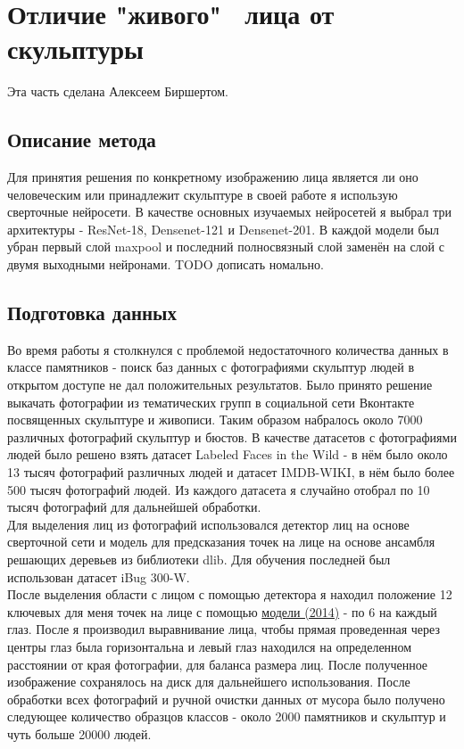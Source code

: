 \documentclass[a4paper,14pt]{extarticle}
\newcommand{\bibref}[3]{\hyperlink{#1}{#2 (#3)}} %
\begin{document}
    \section{Отличие "живого" \, лица от скульптуры}
    Эта часть сделана Алексеем Биршертом. \\

    \subsection{Описание метода}
    Для принятия решения по конкретному изображению лица является ли оно человеческим или принадлежит скульптуре в своей работе я использую сверточные нейросети. В качестве основных изучаемых нейросетей я выбрал три архитектуры - ResNet-18, Densenet-121 и Densenet-201. В каждой модели был убран первый слой maxpool и последний полносвязный слой заменён на слой с двумя выходными нейронами. TODO дописать номально.

    \subsection{Подготовка данных}
    Во время работы я столкнулся с проблемой недостаточного количества данных в классе памятников - поиск баз данных с фотографиями скульптур людей в открытом доступе не дал положительных результатов. Было принято решение выкачать фотографии из тематических групп в социальной сети Вконтакте посвященных скульптуре и живописи. Таким образом набралось около 7000 различных фотографий скульптур и бюстов. В качестве датасетов с фотографиями людей было решено взять датасет Labeled Faces in the Wild - в нём было около 13 тысяч фотографий различных людей и датасет IMDB-WIKI, в нём было более 500 тысяч фотографий людей. Из каждого датасета я случайно отобрал по 10 тысяч фотографий для дальнейшей обработки. \\
    Для выделения лиц из фотографий использовался детектор лиц на основе сверточной сети и модель для предсказания точек на лице на основе ансамбля решающих деревьев из библиотеки dlib. Для обучения последней был использован датасет iBug 300-W. \\
    После выделения области с лицом с помощью детектора я находил положение 12 ключевых для меня точек на лице с помощью \bibref{align}{модели}{2014} - по 6 на каждый глаз. После я производил выравнивание лица, чтобы прямая проведенная через центры глаз была горизонтальна и левый глаз находился на определенном расстоянии от края фотографии, для баланса размера лиц. После полученное изображение сохранялось на диск для дальнейшего использования. После обработки всех фотографий и ручной очистки данных от мусора было получено следующее количество образцов классов - около 2000 памятников и скульптур и чуть больше 20000 людей.
\end{document}
